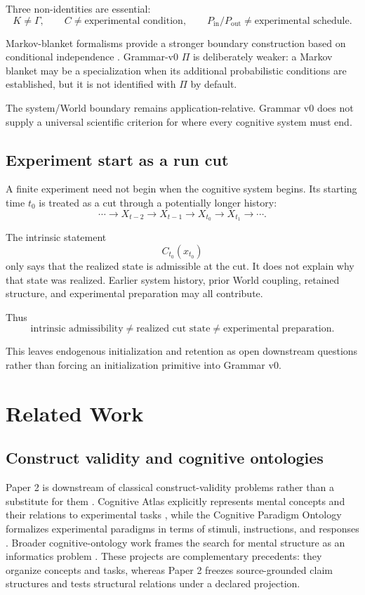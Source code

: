 \documentclass[11pt]{article}
\newcommand{\Pin}{P_{\mathrm{in}}}
\newcommand{\Pout}{P_{\mathrm{out}}}
\begin{document}
Three non-identities are essential:
\[
K\neq\Gamma,
\qquad
C\neq\text{experimental condition},
\qquad
\Pin/\Pout\neq\text{experimental schedule}.
\]

Markov-blanket formalisms provide a stronger boundary construction based on conditional independence \citep{Friston2013Life,KirchhoffEtAl2018MarkovBlankets}. Grammar-v0 \(\Pi\) is deliberately weaker: a Markov blanket may be a specialization when its additional probabilistic conditions are established, but it is not identified with \(\Pi\) by default.

The system/World boundary remains application-relative. Grammar v0 does not supply a universal scientific criterion for where every cognitive system must end.

\subsection{Experiment start as a run cut}

A finite experiment need not begin when the cognitive system begins. Its starting time \(t_0\) is treated as a cut through a potentially longer history:
\[
\cdots
\rightarrow
X_{t-2}
\rightarrow
X_{t-1}
\rightarrow
X_{t_0}
\rightarrow
X_{t_1}
\rightarrow\cdots.
\]

The intrinsic statement
\[
C_{t_0}(x_{t_0})
\]
only says that the realized state is admissible at the cut. It does not explain why that state was realized. Earlier system history, prior World coupling, retained structure, and experimental preparation may all contribute.

Thus
\[
\text{intrinsic admissibility}
\neq
\text{realized cut state}
\neq
\text{experimental preparation}.
\]

This leaves endogenous initialization and retention as open downstream questions rather than forcing an initialization primitive into Grammar v0.

\section{Related Work}

\subsection{Construct validity and cognitive ontologies}

Paper 2 is downstream of classical construct-validity problems rather than a substitute for them \citep{CronbachMeehl1955ConstructValidity,BorsboomMellenberghVanHeerden2004Validity}. Cognitive Atlas explicitly represents mental concepts and their relations to experimental tasks \citep{PoldrackEtAl2011CognitiveAtlas}, while the Cognitive Paradigm Ontology formalizes experimental paradigms in terms of stimuli, instructions, and responses \citep{TurnerLaird2012CogPO}. Broader cognitive-ontology work frames the search for mental structure as an informatics problem \citep{PoldrackYarkoni2016CognitiveOntologies}. These projects are complementary precedents: they organize concepts and tasks, whereas Paper 2 freezes source-grounded claim structures and tests structural relations under a declared projection.
\end{document}
